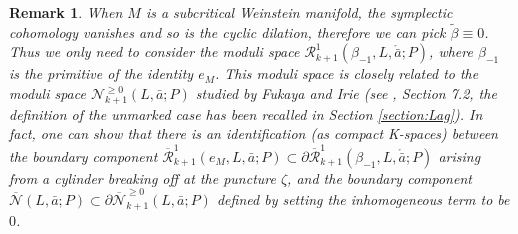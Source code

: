 \documentclass[a4paper]{article}
\newtheorem{remark}[theorem]{Remark}
\numberwithin{equation}{section}
\begin{document}
\begin{remark}\label{remark:subcritical}
When $M$ is a subcritical Weinstein manifold, the symplectic cohomology vanishes and so is the cyclic dilation, therefore we can pick $\tilde{\beta}\equiv0$. Thus we only need to consider the moduli space $\mathcal{R}_{k+1}^1(\beta_{-1},L,\ring{\bar{a}};P)$, where $\beta_{-1}$ is the primitive of the identity $e_M$. This moduli space is closely related to the moduli space $\mathcal{N}_{k+1}^{\geq0}(L,\bar{a};P)$ studied by Fukaya and Irie (see \cite{ki2}, Section 7.2, the definition of the unmarked case has been recalled in Section \ref{section:Lag}). In fact, one can show that there is an identification (as compact K-spaces) between the boundary component $\overline{\mathcal{R}}_{k+1}^1(e_M,L,\bar{a};P)\subset\partial\overline{\mathcal{R}}_{k+1}^1(\beta_{-1},L,\ring{\bar{a}};P)$ arising from a cylinder breaking off at the puncture $\zeta$, and the boundary component $\overline{\mathcal{N}}(L,\bar{a};P)\subset\partial\overline{\mathcal{N}}_{k+1}^{\geq0}(L,\bar{a};P)$ defined by setting the inhomogeneous term to be $0$.
\end{remark}
\end{document}
